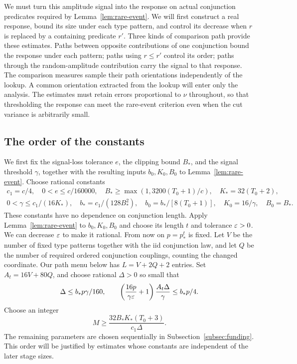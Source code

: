 We must turn this amplitude signal into the response on actual conjunction
predicates required by Lemma~\ref{lem:rare-event}. We will first construct
a real response, bound its size under each type pattern, and control its
decrease when $r$ is replaced by a containing predicate $r'$. Three kinds
of comparison path provide these estimates. Paths between opposite
contributions of one conjunction bound the response under each pattern;
paths using $r\le r'$ control its order; paths through the random-amplitude
contribution carry the signal to that response. The comparison measures
sample their path orientations independently of the lookup. A common
orientation extracted from the lookup will enter only the analysis.
The estimates must retain errors proportional to $\nu$ throughout, so that
thresholding the response can meet the rare-event criterion even when the
cut variance is arbitrarily small.

\subsection{The order of the constants}

We first fix the signal-loss tolerance $e$, the clipping bound $B_*$, and
the signal threshold $\gamma$, together with the resulting inputs
$b_0,K_0,B_0$ to Lemma~\ref{lem:rare-event}. Choose rational constants
\begin{equation}\label{eq:preconjunction-constants}
 \begin{gathered}
 c_1=c/4,\quad 0<e\le c/160000,\quad
 B_*\ge\max(1,3200(T_0+1)/c),\quad K_*=32(T_0+2),\\
 0<\gamma\le c_1/(16K_*),\quad
 b_*=c_1/(128B_*^2),\quad
 b_0=b_*/[8(T_0+1)],\quad K_0=16/\gamma,\quad B_0=B_*.
 \end{gathered}
\end{equation}
These constants have no dependence on conjunction length. Apply
Lemma~\ref{lem:rare-event} to $b_0,K_0,B_0$ and choose its length $t$
and tolerance $\varepsilon>0$. We can decrease $\varepsilon$ to make it rational.
From now on $p=p_*^t$ is fixed. Let $V$ be the number of fixed type
patterns together with the iid conjunction law, and let $Q$ be the
number of required ordered conjunction couplings, counting the changed
coordinate. Our path menu below has $L=V+2Q+2$ entries. Set
$A_t=16V+80Q$, and choose rational $\Delta>0$ so small that
\begin{equation}\label{eq:delta-choice}
 \Delta\le b_*p\gamma/160,\qquad
 \left(\frac{16p}{\gamma\varepsilon}+1\right)
          \frac{A_t\Delta}{\gamma}\le b_*p/4.
\end{equation}
Choose an integer
\begin{equation}\label{eq:stage-number}
 M\ge\frac{32B_*K_*(T_0+3)}{c_1\Delta}.
\end{equation}
The remaining parameters are chosen sequentially in
Subsection~\ref{subsec:funding}. This order will be justified by estimates
whose constants are independent of the later stage sizes.

